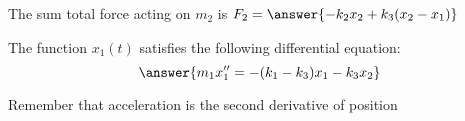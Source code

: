 \documentclass{ximera}%
\begin{document}
\begin{problem}
The sum total force acting on $m_2$ is $F_2 = \answer{-k_2 x_2 + k_3(x_2-x_1)}$
\end{problem}

\begin{problem} The function $x_1(t)$ satisfies the following differential equation:
\[ \answer{m_1 x_1'' = -(k_1-k_3)x_1 -k_3 x_2}\]
\begin{hint} Remember that acceleration is the second derivative of position \end{hint}

\end{problem}
\end{document}
